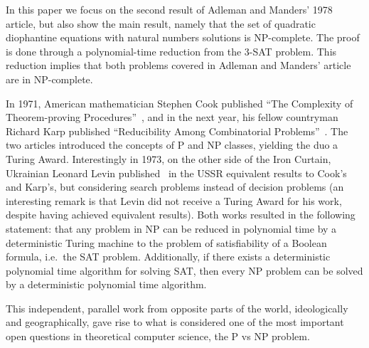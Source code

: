\documentclass{amsart}
\theoremstyle{plain}
\begin{document}
In this paper we focus on the second result of Adleman and Manders' 1978 article, but also show the
main result, namely that the set of quadratic diophantine equations with natural numbers solutions
is NP-complete. The proof is done through a polynomial-time reduction from the 3-SAT problem. This
reduction implies that both problems covered in Adleman and Manders' article are in NP-complete.

In 1971, American mathematician Stephen Cook published ``The Complexity of Theorem-proving
Procedures''~\cite{cook}, and in the next year, his fellow countryman Richard Karp published
``Reducibility Among Combinatorial Problems''~\cite{karp}. The two articles introduced the concepts
of P and NP classes, yielding the duo a Turing Award. Interestingly in 1973, on the other side of
the Iron Curtain, Ukrainian Leonard Levin published~\cite{levin} in the USSR equivalent results to
Cook's and Karp's, but considering search problems instead of decision problems (an interesting
remark is that Levin did not receive a Turing Award for his work, despite having achieved
equivalent results). Both works resulted in the following statement: that any problem in NP can be
reduced in polynomial time by a deterministic Turing machine to the problem of satisfiability of a
Boolean formula, i.e.\ the SAT problem.  Additionally, if there exists a deterministic polynomial
time algorithm for solving SAT, then every NP problem can be solved by a deterministic polynomial
time algorithm.

This independent, parallel work from opposite parts of the world, ideologically and geographically,
gave rise to what is considered one of the most important open questions in theoretical computer
science, the P vs NP problem.
\end{document}
